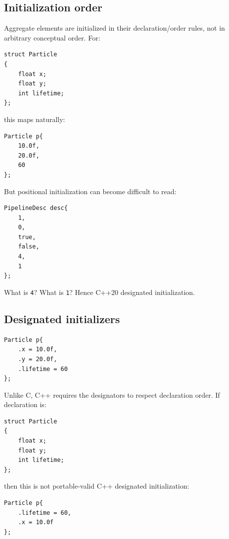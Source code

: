 \subsection{Initialization order}\label{01-foundations-i-ch003-initialization-order}

\hypertarget{01-foundations-i-ch003-initialization-order}{}

Aggregate elements are initialized in their declaration/order rules, not in arbitrary conceptual order. For:

\begin{verbatim}
struct Particle
{
    float x;
    float y;
    int lifetime;
};
\end{verbatim}

this maps naturally:

\begin{verbatim}
Particle p{
    10.0f,
    20.0f,
    60
};
\end{verbatim}

But positional initialization can become difficult to read:

\begin{verbatim}
PipelineDesc desc{
    1,
    0,
    true,
    false,
    4,
    1
};
\end{verbatim}

What is \texttt{4}? What is \texttt{1}? Hence C++20 designated initialization.

\subsection{Designated initializers}\label{01-foundations-i-ch003-designated-initializers}

\hypertarget{01-foundations-i-ch003-designated-initializers}{}

\begin{verbatim}
Particle p{
    .x = 10.0f,
    .y = 20.0f,
    .lifetime = 60
};
\end{verbatim}

Unlike C, C++ requires the designators to respect declaration order. If declaration is:

\begin{verbatim}
struct Particle
{
    float x;
    float y;
    int lifetime;
};
\end{verbatim}

then this is not portable-valid C++ designated initialization:

\begin{verbatim}
Particle p{
    .lifetime = 60,
    .x = 10.0f
};
\end{verbatim}

